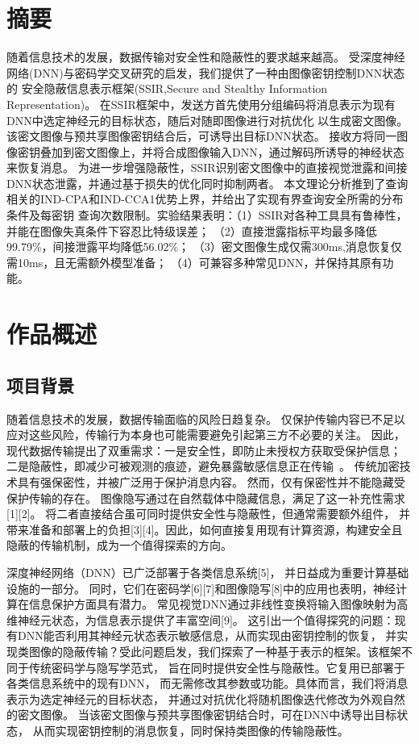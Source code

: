 \documentclass[UTF8,a4paper,zihao=-4,fontset=windows,openany]{ctexbook}
\begin{document}
\chapter*{摘要}
随着信息技术的发展，数据传输对安全性和隐蔽性的要求越来越高。
受深度神经网络(DNN)与密码学交叉研究的启发，我们提供了一种由图像密钥控制DNN状态的
安全隐蔽信息表示框架(SSIR,Secure and Stealthy Information Representation)。
在SSIR框架中，发送方首先使用分组编码将消息表示为现有DNN中选定神经元的目标状态，随后对随即图像进行对抗优化
以生成密文图像。该密文图像与预共享图像密钥结合后，可诱导出目标DNN状态。
接收方将同一图像密钥叠加到密文图像上，并将合成图像输入DNN，通过解码所诱导的神经状态来恢复消息。
为进一步增强隐蔽性，SSIR识别密文图像中的直接视觉泄露和间接DNN状态泄露，并通过基于损失的优化同时抑制两者。
本文理论分析推到了查询相关的IND-CPA和IND-CCA1优势上界，并给出了实现有界查询安全所需的分布条件及每密钥
查询次数限制。实验结果表明：（1）SSIR对各种工具具有鲁棒性，并能在图像失真条件下容忍比特级误差；
（2）直接泄露指标平均最多降低99.79\%，间接泄露平均降低56.02\%；
（3）密文图像生成仅需300ms,消息恢复仅需10ms，且无需额外模型准备；
（4）可兼容多种常见DNN，并保持其原有功能。
\chapter{作品概述}
\section{项目背景}
随着信息技术的发展，数据传输面临的风险日趋复杂。
仅保护传输内容已不足以应对这些风险，传输行为本身也可能需要避免引起第三方不必要的关注。
因此，现代数据传输提出了双重需求：一是安全性，即防止未授权方获取受保护信息；
二是隐蔽性，即减少可被观测的痕迹，避免暴露敏感信息正在传输~\cite{1-wang-moulin-2008}。
传统加密技术具有强保密性，并被广泛用于保护消息内容。
然而，仅有保密性并不能隐藏受保护传输的存在。
图像隐写通过在自然载体中隐藏信息，满足了这一补充性需求[1][2]。
将二者直接结合虽可同时提供安全性与隐蔽性，但通常需要额外组件，
并带来准备和部署上的负担[3][4]。因此，如何直接复用现有计算资源，构建安全且隐蔽的传输机制，成为一个值得探索的方向。

深度神经网络（DNN）已广泛部署于各类信息系统[5]，
并日益成为重要计算基础设施的一部分。
同时，它们在密码学[6][7]和图像隐写[8]中的应用也表明，神经计算在信息保护方面具有潜力。
常见视觉DNN通过非线性变换将输入图像映射为高维神经元状态，为信息表示提供了丰富空间[9]。
这引出一个值得探究的问题：现有DNN能否利用其神经元状态表示敏感信息，从而实现由密钥控制的恢复，
并实现类图像的隐蔽传输？受此问题启发，我们探索了一种基于表示的框架。该框架不同于传统密码学与隐写学范式，
旨在同时提供安全性与隐蔽性。它复用已部署于各类信息系统中的现有DNN，
而无需修改其参数或功能。具体而言，我们将消息表示为选定神经元的目标状态，
并通过对抗优化将随机图像迭代修改为外观自然的密文图像。
当该密文图像与预共享图像密钥结合时，可在DNN中诱导出目标状态，
从而实现密钥控制的消息恢复，同时保持类图像的传输隐蔽性。
\end{document}
